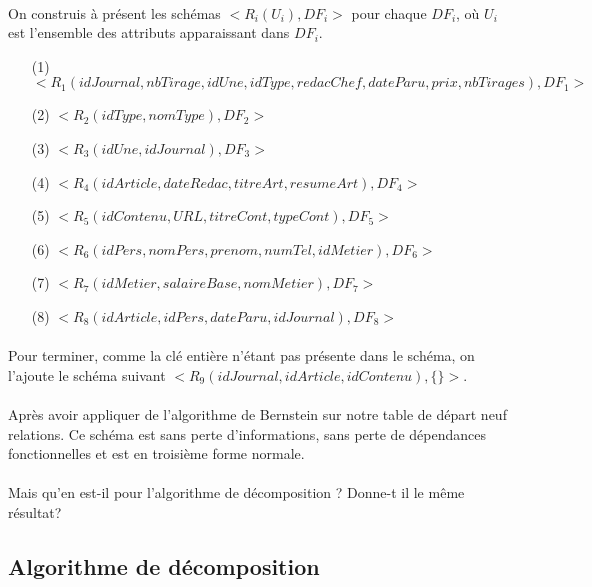 \paragraph{}{
    On construis à présent les schémas $<R_{i}(U_{i}), DF_{i}>$ pour chaque $DF_{i}$, où $U_{i}$ est l'ensemble des attributs apparaissant dans $DF_{i}$.
}
\begin{enumerate}
    \item[(1)] $<R_{1}(idJournal, nbTirage, idUne, idType, redacChef, dateParu, prix, nbTirages), DF_{1}>$
    \item[(2)] $<R_{2}(idType, nomType),DF_{2}>$
    \item[(3)] $<R_{3}(idUne, idJournal),DF_{3}>$
    \item[(4)] $<R_{4}(idArticle, dateRedac, titreArt, resumeArt),DF_{4}>$
    \item[(5)] $<R_{5}(idContenu, URL, titreCont, typeCont),DF_{5}>$
    \item[(6)] $<R_{6}(idPers, nomPers, prenom, numTel, idMetier),DF_{6}>$
    \item[(7)] $<R_{7}(idMetier, salaireBase, nomMetier),DF_{7}>$
    \item[(8)] $<R_{8}(idArticle, idPers, dateParu, idJournal),DF_{8}>$
\end{enumerate}

\paragraph{}{
    Pour terminer, comme la clé entière n'étant pas présente dans le schéma, on l'ajoute le schéma suivant $<R_{9}(idJournal, idArticle, idContenu), \{\}>$.
}

\paragraph{}{
    Après avoir appliquer de l'algorithme de Bernstein sur notre table de départ neuf relations. Ce schéma est sans perte d'informations, sans perte de dépendances fonctionnelles et est en troisième forme normale.
}

\paragraph{}{
    Mais qu'en est-il pour l'algorithme de décomposition ? Donne-t il le même résultat?
}

\subsection{Algorithme de décomposition}
